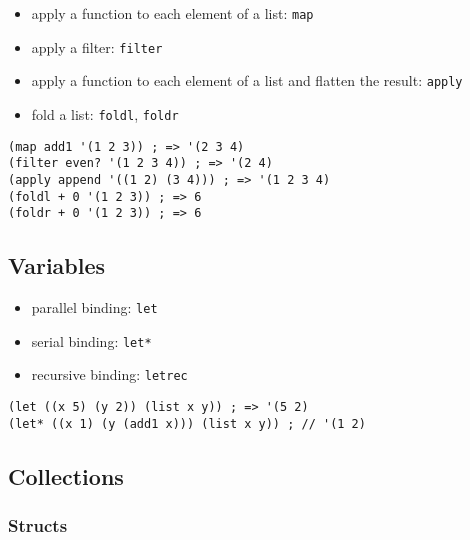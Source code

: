 \documentclass[a4paper,landscape,10pt]{article}
\begin{document}
\begin{multicols*}{2}
  \begin{itemize}
    \item apply a function to each element of a list: \lstinline[language=Racket]!map!
    \item apply a filter: \lstinline[language=Racket]!filter!
    \item apply a function to each element of a list and flatten the result: \lstinline[language=Racket]!apply!
    \item fold a list: \lstinline[language=Racket]!foldl!, \lstinline[language=Racket]!foldr!
  \end{itemize}

  \begin{lstlisting}[language=Racket]
(map add1 '(1 2 3)) ; => '(2 3 4)
(filter even? '(1 2 3 4)) ; => '(2 4)
(apply append '((1 2) (3 4))) ; => '(1 2 3 4)
(foldl + 0 '(1 2 3)) ; => 6
(foldr + 0 '(1 2 3)) ; => 6
\end{lstlisting}


  \subsection{Variables}

  \begin{itemize}
    \item parallel binding: \lstinline[language=Racket]!let!
    \item serial binding: \lstinline[language=Racket]!let*!
    \item recursive binding: \lstinline[language=Racket]!letrec!
  \end{itemize}

  \begin{lstlisting}[language=Racket]
(let ((x 5) (y 2)) (list x y)) ; => '(5 2)
(let* ((x 1) (y (add1 x))) (list x y)) ; // '(1 2)
\end{lstlisting}

  \switchcolumn

  \subsection{Collections}

  \subsubsection{Structs}


\end{multicols*}
\end{document}
